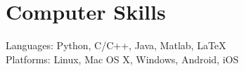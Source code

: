 
\section{\sc Computer Skills}
Languages: Python, C/C++, Java, Matlab, \LaTeX\\
Platforms: Linux, Mac OS X, Windows, Android, iOS
